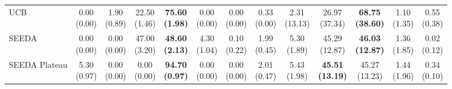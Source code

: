 \begin{table}[H]
{\begin{tabular}{l|cccccc|cccccc}
UCB & \makecell{0.00 \\ (0.00)} & \makecell{1.90 \\ (0.89)} & {\cellcolor[HTML]{C8E6C9}} \makecell{22.50 \\ (1.46)} & \bfseries \makecell{75.60 \\ (1.98)} & \makecell{0.00 \\ (0.00)} & \makecell{0.00 \\ (0.00)} & \makecell{0.33 \\ (0.00)} & \makecell{2.31 \\ (13.13)} & {\cellcolor[HTML]{C8E6C9}} \makecell{26.97 \\ (37.34)} & \bfseries \makecell{68.75 \\ (38.60)} & \makecell{1.10 \\ (1.35)} & \makecell{0.55 \\ (0.38)} \\
SEEDA & \makecell{0.00 \\ (0.00)} & \makecell{0.00 \\ (0.00)} & {\cellcolor[HTML]{C8E6C9}} \makecell{47.00 \\ (3.20)} & \bfseries \makecell{48.60 \\ (2.13)} & \makecell{4.30 \\ (1.04)} & \makecell{0.10 \\ (0.22)} & \makecell{1.99 \\ (0.45)} & \makecell{5.30 \\ (1.89)} & {\cellcolor[HTML]{C8E6C9}} \makecell{45.29 \\ (12.87)} & \bfseries \makecell{46.03 \\ (12.87)} & \makecell{1.36 \\ (1.85)} & \makecell{0.02 \\ (0.12)} \\
SEEDA Plateau & \makecell{5.30 \\ (0.97)} & \makecell{0.00 \\ (0.00)} & {\cellcolor[HTML]{C8E6C9}} \makecell{0.00 \\ (0.00)} & \bfseries \makecell{94.70 \\ (0.97)} & \makecell{0.00 \\ (0.00)} & \makecell{0.00 \\ (0.00)} & \makecell{2.01 \\ (0.47)} & \makecell{5.43 \\ (1.98)} & {\cellcolor[HTML]{C8E6C9}} \bfseries \makecell{45.51 \\ (13.19)} & \makecell{45.27 \\ (13.23)} & \makecell{1.44 \\ (1.96)} & \makecell{0.34 \\ (0.10)} \\
\bottomrule
\end{tabular}
}%
\end{table}
